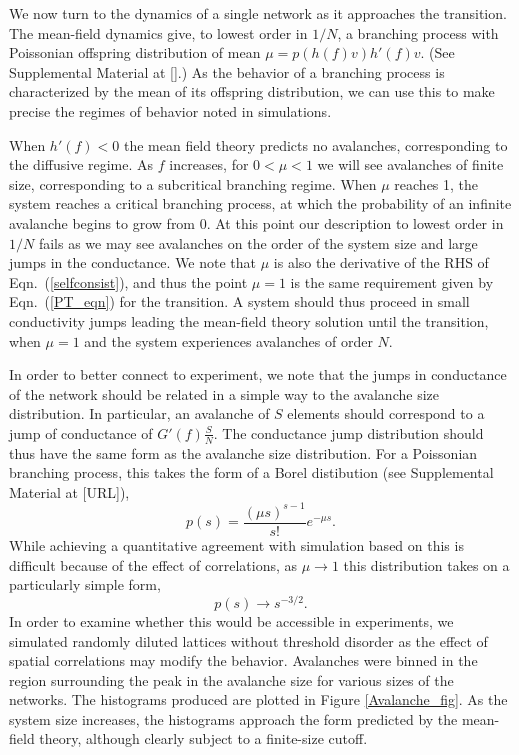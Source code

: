 \documentclass[aps,prl,reprint,groupedaddress]{revtex4-1}
\begin{document}
We now turn to the dynamics of a single network as it approaches the
transition. The mean-field dynamics give, to lowest order in $1/N$, a
branching process with Poissonian offspring distribution of mean
$\mu = p(h(f)v)h'(f)v$. (See Supplemental Material at [].)  As the behavior of a
branching process is characterized by the mean of its offspring distribution,
we can use this to make precise the regimes of behavior noted in simulations.

When $h'(f)<0$ the mean field theory predicts no avalanches, corresponding
to the diffusive
regime.  As $f$ increases, for $0<\mu < 1$ we will see avalanches of finite
size, corresponding to a subcritical branching regime.  When $\mu$ reaches 1,
the system reaches a critical branching process, at which the probability of
an infinite avalanche begins to grow from 0. At this point our description to
lowest order in $1/N$ fails as we may see avalanches on the order of the
system size and large jumps in the conductance.  We note that $\mu$ is also
the derivative of the RHS of Eqn.~(\ref{selfconsist}), and thus the point
$\mu=1$ is the same requirement given by Eqn.~(\ref{PT_eqn}) for the transition. A system
should thus proceed in small conductivity jumps leading the mean-field theory
solution until the transition, when $\mu=1$ and the system experiences
avalanches of order $N$.

In order to better connect to
experiment, we note that the jumps in conductance of the network should be 
related in a simple way to the avalanche size distribution.  In particular,
an avalanche of $S$ elements should correspond to a jump of conductance of
$G'(f)\frac{S}{N}$.  The conductance jump distribution should thus have the
same form as the avalanche size distribution. For a Poissonian branching
process, this takes the form of a Borel distibution
(see Supplemental Material at [URL]),
\begin{equation}
p(s) = \frac{(\mu s)^{s-1}}{s!}e^{-\mu s}.
\end{equation}
While achieving a quantitative agreement with simulation based on this is
difficult because of the effect of correlations,
as $\mu\to 1$ this distribution takes on a particularly simple form,
\begin{equation}
p(s) \to s^{-3/2}.
\end{equation}
In order to examine whether this would be accessible in experiments, we
simulated randomly diluted lattices without threshold disorder as the
effect of spatial correlations may modify the behavior.  Avalanches were
binned in the region surrounding the peak in the avalanche size for
various sizes of the networks. The histograms produced are plotted in
Figure \ref{Avalanche_fig}. As the system size increases, the histograms approach
the form predicted by the mean-field theory, although clearly subject to a finite-size
cutoff.
\end{document}
